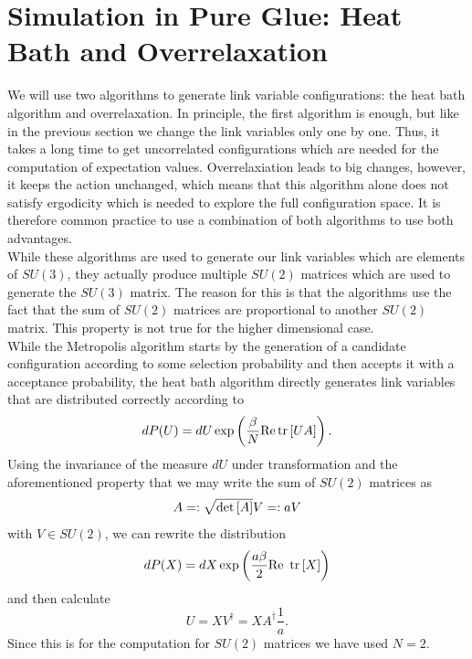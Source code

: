 
\section{Simulation in Pure Glue: Heat Bath and Overrelaxation}
We will use two algorithms to generate link variable configurations: the heat bath algorithm and overrelaxation. In principle, the first algorithm is enough, but like in the previous section we change the link variables only one by one. Thus, it takes a long time to get uncorrelated configurations which are needed for the computation of expectation values. Overrelaxiation leads to big changes, however, it keeps the action unchanged, which means that this algorithm alone does not satisfy ergodicity which is needed to explore the full configuration space. It is therefore common practice to use a combination of both algorithms to use both advantages.\\
While these algorithms are used to generate our link variables which are elements of $SU(3)$, they actually produce multiple $SU(2)$ matrices which are used to generate the $SU(3)$ matrix. The reason for this is that the algorithms use the fact that the sum of $SU(2)$ matrices are proportional to another $SU(2)$ matrix. This property is not true for the higher dimensional case.\\
While the Metropolis algorithm starts by the generation of a candidate configuration according to some selection probability and then accepts it with a acceptance probability, the heat bath algorithm directly generates link variables that are distributed correctly according to
\begin{equation}
    dP(U)=dU\exp\left(\frac{\beta}{N}\text{Re} \operatorname{tr}\left[UA\right]\right).
\end{equation}
Using the invariance of the measure $dU$ under transformation and the aforementioned property that we may write the sum of $SU(2)$ matrices as
\begin{equation}
    A=:\sqrt{\det\left[A\right]}V=:aV
\end{equation}
with $V\in SU(2)$, we can rewrite the distribution
\begin{equation}
    dP(X)=dX\exp\left(\frac{a\beta}{2}\text{Re }\operatorname{tr}\left[X\right]\right)
\end{equation}
and then calculate
\begin{equation}
    U=XV^\dagger=XA^\dagger\frac{1}{a}.
\end{equation}
Since this is for the computation for $SU(2)$ matrices we have used $N=2$.\\
